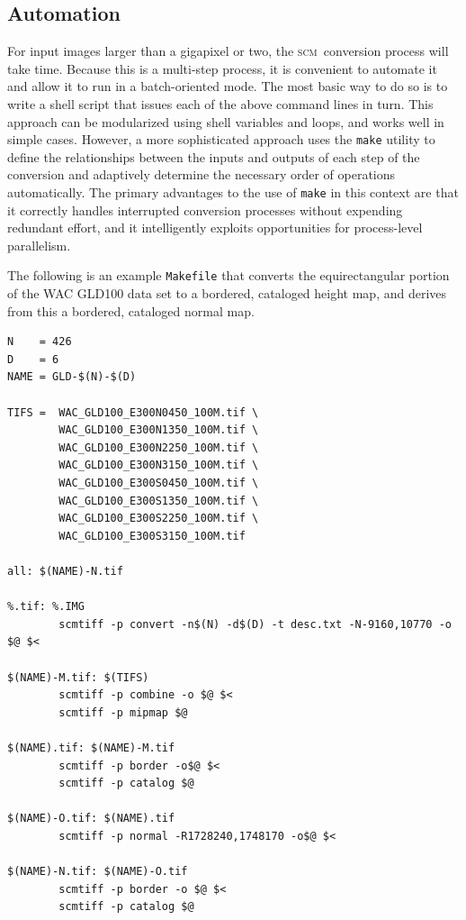 \documentclass[oneside,10pt]{memoir}
\newcommand{\scm}     {\textsc{scm}}
\begin{document}
\begin{Spacing}{1.1}
\section{Automation}
\label{sec:automation}

For input images larger than a gigapixel or two, the \scm\ conversion process will take time. Because this is a multi-step process, it is convenient to automate it and allow it to run in a batch-oriented mode. The most basic way to do so is to write a shell script that issues each of the above command lines in turn. This approach can be modularized using shell variables and loops, and works well in simple cases. However, a more sophisticated approach uses the \texttt{make} utility to define the relationships between the inputs and outputs of each step of the conversion and adaptively determine the necessary order of operations automatically. The primary advantages to the use of \texttt{make} in this context are that it correctly handles interrupted conversion processes without expending redundant effort, and it intelligently exploits opportunities for process-level parallelism.

The following is an example \texttt{Makefile} that converts the equirectangular portion of the WAC GLD100 data set to a bordered, cataloged height map, and derives from this a bordered, cataloged normal map.

\begin{Verbatim}
N    = 426
D    = 6
NAME = GLD-$(N)-$(D)

TIFS =  WAC_GLD100_E300N0450_100M.tif \
        WAC_GLD100_E300N1350_100M.tif \
        WAC_GLD100_E300N2250_100M.tif \
        WAC_GLD100_E300N3150_100M.tif \
        WAC_GLD100_E300S0450_100M.tif \
        WAC_GLD100_E300S1350_100M.tif \
        WAC_GLD100_E300S2250_100M.tif \
        WAC_GLD100_E300S3150_100M.tif

all: $(NAME)-N.tif

%.tif: %.IMG
        scmtiff -p convert -n$(N) -d$(D) -t desc.txt -N-9160,10770 -o $@ $<

$(NAME)-M.tif: $(TIFS)
        scmtiff -p combine -o $@ $<
        scmtiff -p mipmap $@

$(NAME).tif: $(NAME)-M.tif
        scmtiff -p border -o$@ $<
        scmtiff -p catalog $@

$(NAME)-O.tif: $(NAME).tif
        scmtiff -p normal -R1728240,1748170 -o$@ $<

$(NAME)-N.tif: $(NAME)-O.tif
        scmtiff -p border -o $@ $<
        scmtiff -p catalog $@
\end{Verbatim}


\end{Spacing}
\end{document}
